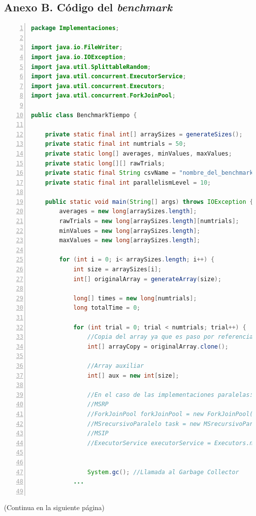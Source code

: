 \documentclass[titlepage]{article}
\begin{document}
\subsection*{Anexo B. Código del \textit{benchmark}}
	\begin{lstlisting}[language=java, frame=single, numbers=left, float=h, breaklines=true]
package Implementaciones;

import java.io.FileWriter;
import java.io.IOException;
import java.util.SplittableRandom;
import java.util.concurrent.ExecutorService;
import java.util.concurrent.Executors;
import java.util.concurrent.ForkJoinPool;

public class BenchmarkTiempo {
	
	private static final int[] arraySizes = generateSizes();
	private static final int numtrials = 50;
	private static long[] averages, minValues, maxValues;
	private static long[][] rawTrials;
	private static final String csvName = "nombre_del_benchmark_de_tiempo.csv";
	private static final int parallelismLevel = 10;
	
	public static void main(String[] args) throws IOException {
		averages = new long[arraySizes.length];
		rawTrials = new long[arraySizes.length][numtrials];
		minValues = new long[arraySizes.length];
		maxValues = new long[arraySizes.length];
		
		for (int i = 0; i< arraySizes.length; i++) {
			int size = arraySizes[i];
			int[] originalArray = generateArray(size);
			
			long[] times = new long[numtrials];
			long totalTime = 0;
			
			for (int trial = 0; trial < numtrials; trial++) {
				//Copia del array ya que es paso por referencia
				int[] arrayCopy = originalArray.clone();
				
				//Array auxiliar
				int[] aux = new int[size];
				
				//En el caso de las implementaciones paralelas:
				//MSRP
				//ForkJoinPool forkJoinPool = new ForkJoinPool(parallelismLevel);
				//MSrecursivoParalelo task = new MSrecursivoParaleloCustomThresh(arrayCopy, aux, 0, size-1);
				//MSIP
				//ExecutorService executorService = Executors.newFixedThreadPool(parallelismLevel);
				
				
				System.gc(); //Llamada al Garbage Collector				
			...
			
	\end{lstlisting}
	(Continua en la siguiente página)
	
\end{document}
